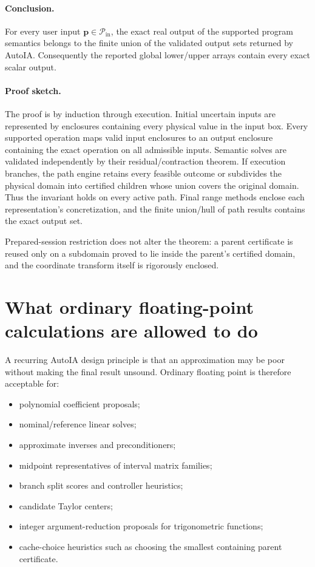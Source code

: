\documentclass[11pt]{article}
\newcommand{\Pin}{\mathcal{P}_{\mathrm{in}}}
\newcommand{\pv}{\mathbf{p}}
\begin{document}
\paragraph{Conclusion.}
For every user input \(\pv\in\Pin\), the exact real output of the supported
program semantics belongs to the finite union of the validated output sets
returned by AutoIA.  Consequently the reported global lower/upper arrays contain
every exact scalar output.

\paragraph{Proof sketch.}
The proof is by induction through execution.  Initial uncertain inputs are
represented by enclosures containing every physical value in the input box.
Every supported operation maps valid input enclosures to an output enclosure
containing the exact operation on all admissible inputs.  Semantic solves are
validated independently by their residual/contraction theorem.  If execution
branches, the path engine retains every feasible outcome or subdivides the
physical domain into certified children whose union covers the original domain.
Thus the invariant holds on every active path.  Final range methods enclose each
representation's concretization, and the finite union/hull of path results
contains the exact output set.

Prepared-session restriction does not alter the theorem: a parent certificate is
reused only on a subdomain proved to lie inside the parent's certified domain,
and the coordinate transform itself is rigorously enclosed.

\section{What ordinary floating-point calculations are allowed to do}

A recurring AutoIA design principle is that an approximation may be poor without
making the final result unsound.  Ordinary floating point is therefore acceptable
for:
\begin{itemize}[leftmargin=*]
\item polynomial coefficient proposals;
\item nominal/reference linear solves;
\item approximate inverses and preconditioners;
\item midpoint representatives of interval matrix families;
\item branch split scores and controller heuristics;
\item candidate Taylor centers;
\item integer argument-reduction proposals for trigonometric functions;
\item cache-choice heuristics such as choosing the smallest containing parent
certificate.
\end{itemize}
\end{document}
